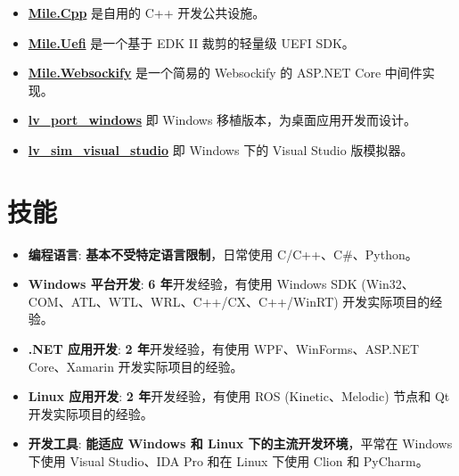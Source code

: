 \documentclass{resume}
\begin{document}
\begin{itemize}
  \item \href{https://github.com/ProjectMile/Mile.Cpp}{\textbf{Mile.Cpp}} 是自用的 C++ 开发公共设施。
  \item \href{https://github.com/ProjectMile/Mile.Uefi}{\textbf{Mile.Uefi}} 是一个基于 EDK II 裁剪的轻量级 UEFI SDK。
  \item \href{https://github.com/ProjectMile/Mile.Websockify}{\textbf{Mile.Websockify}} 是一个简易的 Websockify 的 ASP.NET Core 中间件实现。
\end{itemize}

\begin{itemize}
  \item \href{https://github.com/lvgl/lv_port_windows}{\textbf{lv\_port\_windows}} 即 Windows 移植版本，为桌面应用开发而设计。
  \item \href{https://github.com/lvgl/lv_sim_visual_studio}{\textbf{lv\_sim\_visual\_studio}} 即 Windows 下的 Visual Studio 版模拟器。
\end{itemize}

\section{技能}
\begin{itemize}

  \item \textbf{编程语言}:
    \textbf{基本不受特定语言限制}，日常使用 C/C++、C\#、Python。

  \item \textbf{Windows 平台开发}:
    \textbf{6 年}开发经验，有使用 Windows SDK (Win32、COM、ATL、WTL、WRL、C++/CX、C++/WinRT) 开发实际项目的经验。

  \item \textbf{.NET 应用开发}:
    \textbf{2 年}开发经验，有使用 WPF、WinForms、ASP.NET Core、Xamarin 开发实际项目的经验。
  
  \item \textbf{Linux 应用开发}:
    \textbf{2 年}开发经验，有使用 ROS (Kinetic、Melodic) 节点和 Qt 开发实际项目的经验。

  \item \textbf{开发工具}:
    \textbf{能适应 Windows 和 Linux 下的主流开发环境}，平常在 Windows 下使用 Visual Studio、IDA Pro 和在 Linux 下使用 Clion 和 PyCharm。

\end{itemize}
\end{document}
